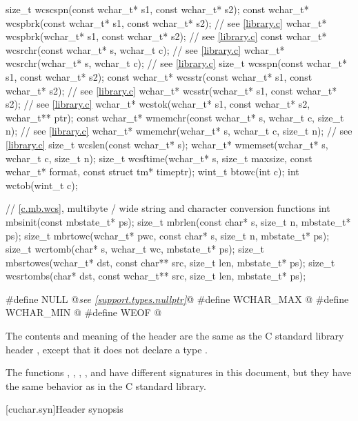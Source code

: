 \begin{codeblock}
{  size_t wcscspn(const wchar_t* s1, const wchar_t* s2);
  const wchar_t* wcspbrk(const wchar_t* s1, const wchar_t* s2);  // see \ref{library.c}
  wchar_t* wcspbrk(wchar_t* s1, const wchar_t* s2);  // see \ref{library.c}
  const wchar_t* wcsrchr(const wchar_t* s, wchar_t c);  // see \ref{library.c}
  wchar_t* wcsrchr(wchar_t* s, wchar_t c);  // see \ref{library.c}
  size_t wcsspn(const wchar_t* s1, const wchar_t* s2);
  const wchar_t* wcsstr(const wchar_t* s1, const wchar_t* s2);  // see \ref{library.c}
  wchar_t* wcsstr(wchar_t* s1, const wchar_t* s2);  // see \ref{library.c}
  wchar_t* wcstok(wchar_t* s1, const wchar_t* s2, wchar_t** ptr);
  const wchar_t* wmemchr(const wchar_t* s, wchar_t c, size_t n);  // see \ref{library.c}
  wchar_t* wmemchr(wchar_t* s, wchar_t c, size_t n);  // see \ref{library.c}
  size_t wcslen(const wchar_t* s);
  wchar_t* wmemset(wchar_t* s, wchar_t c, size_t n);
  size_t wcsftime(wchar_t* s, size_t maxsize, const wchar_t* format, const struct tm* timeptr);
  wint_t btowc(int c);
  int wctob(wint_t c);

  // \ref{c.mb.wcs}, multibyte / wide string and character conversion functions
  int mbsinit(const mbstate_t* ps);
  size_t mbrlen(const char* s, size_t n, mbstate_t* ps);
  size_t mbrtowc(wchar_t* pwc, const char* s, size_t n, mbstate_t* ps);
  size_t wcrtomb(char* s, wchar_t wc, mbstate_t* ps);
  size_t mbsrtowcs(wchar_t* dst, const char** src, size_t len, mbstate_t* ps);
  size_t wcsrtombs(char* dst, const wchar_t** src, size_t len, mbstate_t* ps);
}

#define NULL @\textit{see \ref{support.types.nullptr}}@
#define WCHAR_MAX @\seebelow@
#define WCHAR_MIN @\seebelow@
#define WEOF @\seebelow@
\end{codeblock}

\pnum
{}%
The contents and meaning of the header 
are the same as the C standard library header
, except that it does not declare a type .

\pnum
\begin{note}
The functions
, , , , and 
have different signatures in this document,
but they have the same behavior as in the C standard library.
\end{note}


[cuchar.syn]{Header  synopsis}

